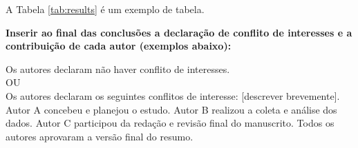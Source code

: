 \documentclass[a4paper,10pt,twocolumn]{article}
\begin{document}
A Tabela \ref*{tab:results} é um exemplo de tabela.

\begin{table}[t]
    \centering
    \renewcommand{\arraystretch}{1.2}
    \caption{Tabela de exemplo.}
    \label{tab:results}
\end{table}
\textbf{Inserir ao final das conclusões a declaração de conflito de interesses e a contribuição de cada autor (exemplos abaixo):}

Os autores declaram não haver conflito de interesses.\\
OU\\
Os autores declaram os seguintes conflitos de interesse: [descrever brevemente].\\
Autor A concebeu e planejou o estudo. Autor B realizou a coleta e análise dos dados. Autor C participou da redação e revisão final do manuscrito. Todos os autores aprovaram a versão final do resumo.
\end{document}

